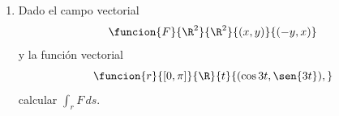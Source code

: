 \documentclass[a4,11pt]{aleph-examen}
\begin{document}
\begin{preguntas}
\begin{respuesta}
\begin{respuesta}
\begin{respuesta}
\begin{enumerate}
\begin{respuesta}
    Notemos que $r$ es derivable  con derivada
    \[
    r'(t) = (2e^{2t}\cos{3t} - 3e^{2t}\sen{3t}, 2e^{2t}\sen{3t} + 3e^{2t}\cos{3t}, 2e^{2t}),
    \]
    con
    \begin{align*}
    \|r'(t)\| &= \sqrt{13e^{4t}\cos^{2}{3t} + 13e^{4t}\sen^{2}{3t} + 4e^{4t}},\\
    					&= \sqrt{13e^{4t} + 4e^{4t}},\\
                        &= \sqrt{17e^{4t}},\\
                        &= e^{2t}\sqrt{17}.
    \end{align*}
    para todo $t\in[0, 5]$, además, 
    \begin{align*}
    f(r(t)) &= f(e^{2t}\cos{3t}, e^{2t}\sen{3t}, e^{2t}),\\
    		&= \dfrac{e^{2t}}{e^{4t}\cos^{2}{3t} + e^{4t}\sen^{2}{3t}},\\
            &= \dfrac{e^{2t}}{e^{4t}},\\
            &= e^{-2t}.
    \end{align*}
    Entonces,
    \begin{align*}
    \int_{0}^{5}{f(r(t))\|r'(t)\| \, dt} &= \sqrt{17}\int_{0}^{5}{e^{-2t} e^{2t} \, dt},\\
    		&= \sqrt{17}\int_{0}^{5}{dt},\\
            &= 5\sqrt{17}.
    \end{align*}
    Por lo tanto, $\int_{0}^{5}{f(r(t))\|r'(t)\| \, dt} = 5\sqrt{17}$.
\end{respuesta}

\item Dado el campo vectorial
    \[
        \funcion{F}{\R^2}{\R^2}
        {(x,y)}{(-y, x)}
	\]
    y la función vectorial
    \[
        \funcion{r}{[0, \pi]}{\R}
        {t}{(\cos{3t}, \sen{3t}),}
	\]
    calcular $\displaystyle\int_{r}{F\, ds}$.
    

\end{enumerate}
\end{respuesta}
\end{respuesta}
\end{respuesta}
\end{preguntas}
\end{document}
